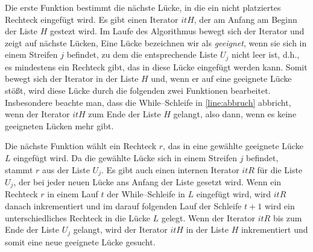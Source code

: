 Die erste Funktion bestimmt die nächste Lücke, in die ein nicht platziertes Rechteck 
eingefügt wird. Es gibt einen Iterator $itH$, der am Anfang am Beginn der Liste $H$ gestezt wird.
Im Laufe des Algorithmus bewegt sich der Iterator und zeigt auf nächste Lücken,
Eine Lücke bezeichnen wir als \textit{geeignet}, wenn sie sich in einem
Streifen $j$ befindet, zu dem die entsprechende Liste $U_j$ nicht leer ist, d.h., 
es mindestens ein Rechteck gibt, das in diese Lücke eingefügt werden kann.
Somit bewegt sich der Iterator in der Liste $H$ und, wenn er auf eine geeignete Lücke 
stößt, wird diese Lücke durch die folgenden zwei Funktionen bearbeitet.
Insbesondere beachte man, dass die While--Schleife in \cref{line:abbruch} abbricht, wenn
der Iterator $itH$ zum Ende der Liste $H$ gelangt, also dann,
wenn es keine geeigneten Lücken mehr gibt. 

Die nächste Funktion wählt ein Rechteck $r$, das in eine gewählte geeignete Lücke $L$
eingefügt wird. Da die gewählte Lücke sich in einem Streifen $j$ befindet, stammt $r$
aus der Liste $U_j$.
Es gibt auch einen internen Iterator $itR$ für die Liste $U_j$,
der bei jeder neuen Lücke ans Anfang der Liste gesetzt wird.
Wenn ein Rechteck $r$ in einem Lauf $t$ der While--Schleife in $L$ eingefügt wird,
wird $itR$ danach inkrementiert und im darauf folgenden Lauf der 
Schleife $t+1$ wird ein unterschiedliches Rechteck in die Lücke $L$ gelegt.
Wenn der Iterator $itR$ bis zum Ende der Liste $U_j$ gelangt, wird der Iterator $itH$
in der Liste $H$ inkrementiert und somit eine neue 
geeignete Lücke gesucht.

